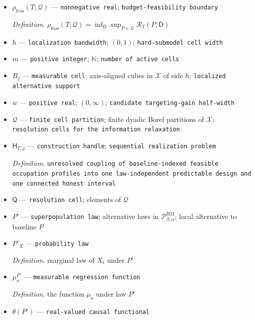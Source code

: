 \documentclass{article}
\begin{document}
\begin{itemize}
  \par\smallskip\noindent\emph{Definition.} \(r_{\beta,\alpha,d}=(\beta+d-\alpha\beta)/(2\beta+d)\)
  \item \(\rho_{\mathrm{feas}}(T;\mathcal Q)\) --- \texttt{nonnegative real}; \texttt{budget-\allowbreak{}feasibility boundary}
  \par\smallskip\noindent\emph{Definition.} \(\rho_{\mathrm{feas}}(T;\mathcal Q)=\inf_{\mathsf D}\sup_{P\in\mathcal Q}\mathcal R_T(P,\mathsf D)\)
  \item \(h\) --- \texttt{localization bandwidth}; \((0,1)\); \texttt{hard-\allowbreak{}submodel cell width}
  \item \(m\) --- \texttt{positive integer}; \(\mathbb N\); \texttt{number of active cells}
  \item \(B_j\) --- \texttt{measurable cell}; axis-aligned cubes in \(\mathcal X\) of side \(h\); \texttt{localized alternative support}
  \item \(w\) --- \texttt{positive real}; \((0,\infty)\); \texttt{candidate targeting-\allowbreak{}gain half-\allowbreak{}width}
  \item \(\mathscr Q\) --- \texttt{finite cell partition}; finite dyadic Borel partitions of \(\mathcal X\); \texttt{resolution cells for the information relaxation}
  \item \(\mathsf H_{T,\rho}\) --- \texttt{construction handle}; \texttt{sequential realization problem}
  \par\smallskip\noindent\emph{Definition.} \texttt{unresolved coupling of baseline-\allowbreak{}indexed feasible occupation profiles into one law-\allowbreak{}independent predictable design and one connected honest interval}
  \item \(\mathsf Q\) --- \texttt{resolution cell}; elements of \(\mathscr Q\)
  \item \(P'\) --- \texttt{superpopulation law}; alternative laws in \(\mathcal P_{\beta,\alpha}^{\mathrm{HM}}\); local alternative to baseline \(P\)
  \item \(P'_X\) --- \texttt{probability law}
  \par\smallskip\noindent\emph{Definition.} marginal law of \(X_t\) under \(P'\)
  \item \(\mu_a^{P'}\) --- \texttt{measurable regression function}
  \par\smallskip\noindent\emph{Definition.} the function \(\mu_a\) under law \(P'\)
  \item \(\theta(P')\) --- \texttt{real-\allowbreak{}valued causal functional}

\end{itemize}
\end{document}
